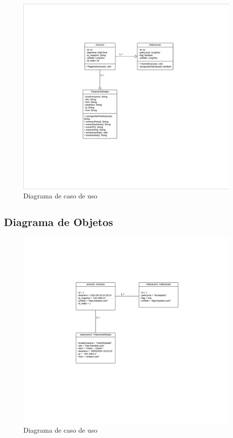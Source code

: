 \documentclass[
  a4paper,%
  12pt,%
  english,%
  brazilian,%
]{article}
\begin{document}
    \begin{figure}[H]
        \centering
        \caption{Diagrama de caso de uso}
        \label{fig:diagrama-caso-uso}
        \includegraphics[width=\textwidth]{Logos/diagrama-de-Classes.pdf}
    \end{figure}

     

    \subsection*{Diagrama de Objetos}


\begin{figure}[H]
    \centering
    \caption{Diagrama de caso de uso}
    \label{fig:diagrama-caso-uso}
    \includegraphics[width=\textwidth]{Logos/diagrama-de-Objetos.pdf}
\end{figure}
\end{document}
